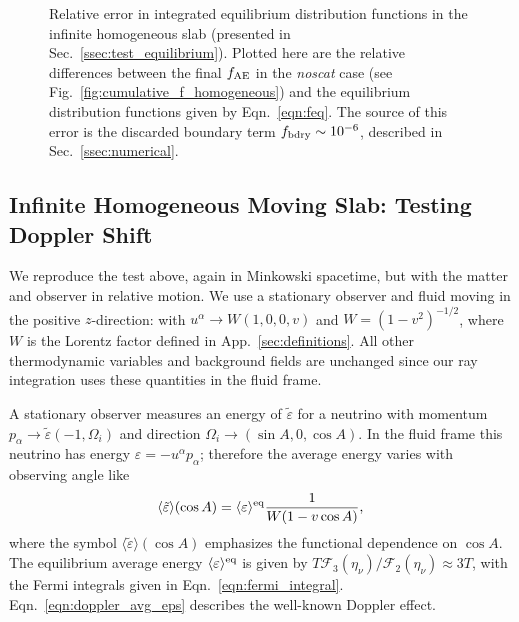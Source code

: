 \documentclass[aps,floatfix,prd,superscriptaddress,twocolumn]{revtex4-1}
\begin{document}
\begin{figure}
  \resizebox{\columnwidth}{!}{}
  \caption{Relative error in integrated equilibrium distribution functions
    in the infinite homogeneous slab
    (presented in Sec.~\ref{ssec:test_equilibrium}).
    Plotted here are the relative differences between the final
    $f_{\rm AE}$ in the \emph{noscat} case
    (see Fig.~\ref{fig:cumulative_f_homogeneous})
    and the equilibrium distribution functions given by
    Eqn.~\ref{eqn:feq}.
    The source of this error is the discarded boundary term
    $f_{\rm bdry}\sim10^{-6}$, described in Sec.~\ref{ssec:numerical}.
  }
  \label{fig:homogeneous_isotropic}
\end{figure}

\subsection{Infinite Homogeneous Moving Slab:
  Testing Doppler Shift}
\label{ssec:test_doppler}
We reproduce the test above, again in Minkowski spacetime,
but with the matter and observer in relative motion.
We use a stationary observer
and fluid moving in the positive $z$-direction:
with $u^\alpha \rightarrow W(1,0,0,v)$ and $W=(1-v^2)^{-1/2}$,
where $W$ is the Lorentz factor defined in App.~\ref{sec:definitions}.
All other thermodynamic variables and background fields are unchanged
since our ray integration uses these quantities in the fluid frame.

A stationary observer measures an energy of $\tilde{\varepsilon}$
for a neutrino with momentum
$p_\alpha \rightarrow \tilde{\varepsilon}(-1,\Omega_i)$
and direction $\Omega_i \rightarrow (\sin A, 0, \cos A)$.
In the fluid frame this neutrino has energy $\varepsilon=-u^\alpha p_\alpha$;
therefore the average energy varies with observing angle like
\begin{equation}
  \label{eqn:doppler_avg_eps}
  \langle \tilde{\varepsilon} \rangle(\cos A) =
  \langle \varepsilon \rangle^{\rm eq} \frac{1}{W(1-v \cos A)},
\end{equation}
where the symbol $\langle \tilde{\varepsilon} \rangle(\cos A)$ emphasizes
the functional dependence on $\cos A$.
The equilibrium average energy $\langle \varepsilon \rangle^{\rm eq}$
is given by $T \mathscr{F}_3(\eta_\nu)/\mathscr{F}_2(\eta_\nu)\approx 3T$,
with the Fermi integrals given in Eqn.~\ref{eqn:fermi_integral}.
Eqn.~\ref{eqn:doppler_avg_eps} describes the well-known Doppler effect.
\end{document}
